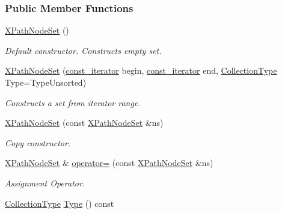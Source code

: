 \subsubsection*{Public Member Functions}
\begin{DoxyCompactItemize}
\item 
\hypertarget{classphys_1_1xml_1_1XPathNodeSet_a24b0e325cd45548e3f63bd37557eab93}{
\hyperlink{classphys_1_1xml_1_1XPathNodeSet_a24b0e325cd45548e3f63bd37557eab93}{XPathNodeSet} ()}
\label{de/dc2/classphys_1_1xml_1_1XPathNodeSet_a24b0e325cd45548e3f63bd37557eab93}

\begin{DoxyCompactList}\small\item\em Default constructor. Constructs empty set. \item\end{DoxyCompactList}\item 
\hyperlink{classphys_1_1xml_1_1XPathNodeSet_a4184ec067744749dd044f7740d2dc6e3}{XPathNodeSet} (\hyperlink{classphys_1_1xml_1_1XPathNode}{const\_\-iterator} begin, \hyperlink{classphys_1_1xml_1_1XPathNode}{const\_\-iterator} end, \hyperlink{classphys_1_1xml_1_1XPathNodeSet_ab178d39e119369702541033c067a995c}{CollectionType} Type=TypeUnsorted)
\begin{DoxyCompactList}\small\item\em Constructs a set from iterator range. \item\end{DoxyCompactList}\item 
\hyperlink{classphys_1_1xml_1_1XPathNodeSet_af4ac7af973425828bd66dc278887695c}{XPathNodeSet} (const \hyperlink{classphys_1_1xml_1_1XPathNodeSet}{XPathNodeSet} \&ns)
\begin{DoxyCompactList}\small\item\em Copy constructor. \item\end{DoxyCompactList}\item 
\hyperlink{classphys_1_1xml_1_1XPathNodeSet}{XPathNodeSet} \& \hyperlink{classphys_1_1xml_1_1XPathNodeSet_a10ab6b5b2188af5d7db6930473fa0190}{operator=} (const \hyperlink{classphys_1_1xml_1_1XPathNodeSet}{XPathNodeSet} \&ns)
\begin{DoxyCompactList}\small\item\em Assignment Operator. \item\end{DoxyCompactList}\item 
\hyperlink{classphys_1_1xml_1_1XPathNodeSet_ab178d39e119369702541033c067a995c}{CollectionType} \hyperlink{classphys_1_1xml_1_1XPathNodeSet_a95c90708290e045ef04425a71b2ddf25}{Type} () const 

\end{DoxyCompactItemize}
